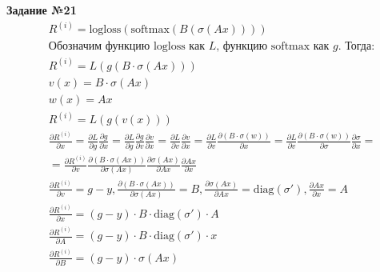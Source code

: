 \documentclass{report}
\begin{document}
\par \textbf{Задание №21}
 \begin{align*}
& R^{(i)} = \text{logloss}(\text{softmax}(B(\sigma(Ax)))) \\
& \text{Обозначим функцию logloss как } L \text{, функцию softmax как } g \text{. Тогда:} \\
& R^{(i)} = L(g(B \cdot \sigma(Ax))) \\
& v(x) = B \cdot \sigma(Ax) \\
& w(x) = Ax \\
& R^{(i)} = L(g(v(x))) \\
& \frac{\partial R^{(i)}}{\partial x} = \frac{\partial L}{\partial g} \frac{\partial g}{\partial x} = \frac{\partial L}{\partial g} \frac{\partial g}{\partial v} \frac{\partial v}{\partial x} = \frac{\partial L}{\partial v} \frac{\partial v}{\partial x} = \frac{\partial L}{\partial v} \frac{\partial (B \cdot \sigma(w))}{\partial x} = \frac{\partial L}{\partial v} \frac{\partial (B \cdot \sigma(w))}{\partial \sigma} \frac{\partial \sigma}{\partial x} = \\
& = \frac{\partial R^{(i)}}{\partial v} \frac{\partial (B \cdot \sigma(Ax))}{\partial \sigma(Ax)} \frac{\partial \sigma(Ax)}{\partial Ax} \frac{\partial Ax}{\partial x} \\
& \frac{\partial R^{(i)}}{\partial v} = g - y,
  \frac{\partial (B \cdot \sigma(Ax))}{\partial \sigma(Ax)} = B,
  \frac{\partial \sigma(Ax)}{\partial Ax} = \text{diag}(\sigma'),
  \frac{\partial Ax}{\partial x} = A \\
& \frac{\partial R^{(i)}}{\partial x} = (g - y) \cdot B \cdot \text{diag}(\sigma') \cdot A \\
& \frac{\partial R^{(i)}}{\partial A} = (g - y) \cdot B \cdot \text{diag}(\sigma') \cdot x \\
& \frac{\partial R^{(i)}}{\partial B} = (g - y) \cdot \sigma(Ax)
\end{align*}
\end{document}
